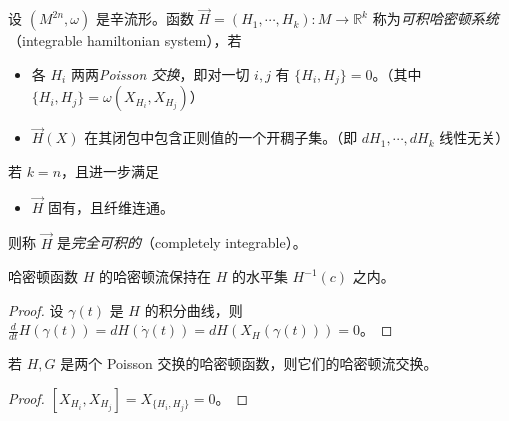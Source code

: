 \begin{definition*}
设 $(M^{2n},\omega)$ 是辛流形。函数 $\vec{H}=(H_1,\dotsb, H_k)\colon M\to\mathbb{R}^k$ 称为\emph{可积哈密顿系统}（integrable hamiltonian system），若

\begin{itemize}[leftmargin=1.4em,itemsep=1pt,topsep=2pt]
  \item 各 $H_i$ 两两\emph{Poisson 交换}，即对一切 $i,j$ 有 $\{H_i, H_j\}=0$。（其中 $\{H_i,H_j\}=\omega (X_{H_i}, X_{H_j})$）
  \item $\vec{H}(X)$ 在其闭包中包含正则值的一个开稠子集。（即 $dH_1,\dotsb, dH_k$ 线性无关）
\end{itemize}

若 $k=n$，且进一步满足

\begin{itemize}[leftmargin=1.4em,itemsep=1pt,topsep=2pt]
  \item $\vec{H}$ 固有，且纤维连通。
\end{itemize}

则称 $\vec{H}$ 是\emph{完全可积的}（completely integrable）。
\end{definition*}


\begin{proposition*}
哈密顿函数 $H$ 的哈密顿流保持在 $H$ 的水平集 $H^{-1} (c)$ 之内。
\end{proposition*}

\begin{proof}
设 $\gamma(t)$ 是 $H$ 的积分曲线，则 $\displaystyle\frac{d}{dt} H(\gamma(t))=dH(\dot{\gamma} (t))=dH(X_H(\gamma(t)))=0$。
\end{proof}


\begin{proposition*}
若 $H,G$ 是两个 Poisson 交换的哈密顿函数，则它们的哈密顿流交换。
\end{proposition*}

\begin{proof}
$\left[X_{H_i},X_{H_j}\right]=X_{\{H_i,H_j\}}=0$。
\end{proof}

